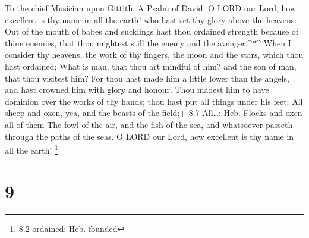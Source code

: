 To the chief Musician upon Gittith, A Psalm of David.  O
LORD our Lord, how excellent is thy name in all the earth! who hast set
thy glory above the heavens.  Out of the mouth of babes and
sucklings hast thou ordained strength because of thine enemies, that
thou mightest still the enemy and the avenger.\^{}*\^{} 
When I consider thy heavens, the work of thy fingers, the moon and the
stars, which thou hast ordained;  What is man, that thou art
mindful of him? and the son of man, that thou visitest him? 
For thou hast made him a little lower than the angels, and hast crowned
him with glory and honour.  Thou madest him to have dominion
over the works of thy hands; thou hast put all things under his feet:
 All sheep and oxen, yea, and the beasts of the field;+ 8.7
All\ldots: Heb. Flocks and oxen all of them  The fowl of the
air, and the fish of the sea, and whatsoever passeth through the paths
of the seas.  O LORD our Lord, how excellent is thy name in
all the earth! \footnote{8.2 ordained: Heb. founded}

\hypertarget{section-8}{%
\section{9}\label{section-8}}

